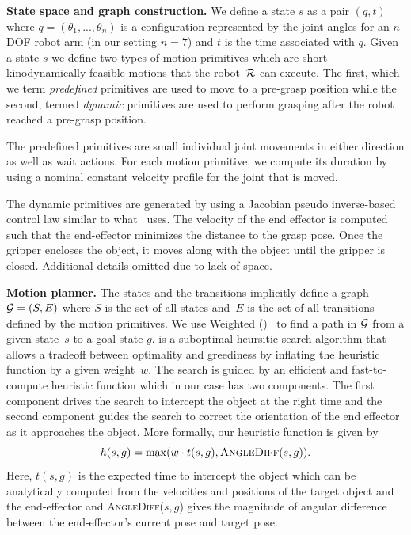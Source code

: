 \documentclass[conference]{IEEEtran}
\begin{document}
\textbf{State space and graph construction.}
We define a state $s$ as a pair $(q,t)$ where $q = (\theta_1, ..., \theta_n)$ is a configuration represented by the joint angles for an $n$-DOF robot arm (in our setting $n=7$) and $t$ is the time associated with $q$.
%
Given a state $s$ we define two types of motion primitives which are short kinodynamically feasible motions that the robot~$\mathcal{R}$ can execute. The first, which we term \emph{predefined} primitives are used to move to a pre-grasp position while the second, termed \emph{dynamic} primitives are used to perform grasping after the robot reached a pre-grasp position.
%

The predefined primitives are small individual joint movements in either direction as well as wait actions.
For each motion primitive, we compute its duration by using a nominal constant velocity profile for the  joint that is moved.
%

The dynamic primitives are generated by using a Jacobian pseudo inverse-based control law similar to what~\cite{menon2014motion} uses. 
The velocity of the end effector is computed such that the end-effector minimizes the distance to the grasp pose. Once the gripper encloses the object, it moves along with the object until the gripper is closed.
Additional details omitted due to lack of space. 

\textbf{Motion planner.}
The states and the transitions implicitly define a graph $\mathcal{G} = (S,E)$ where $S$ is the set of all states and~$E$ is the set of all transitions defined by the motion primitives. We use Weighted \astar (\wastar)~\cite{pohl1970heuristic} to find a path in $\mathcal{G}$ from a given state~$s$ to a goal state $g$. 
\wastar is a suboptimal heursitic search algorithm that allows a tradeoff between optimality and greediness by inflating the heuristic function by a given weight~$w$. 
The search is guided by an efficient and fast-to-compute heuristic function which in our case has two components.
The first component drives the search to intercept the object at the right time and 
the second component guides the search to correct the orientation of the end effector as it approaches the object. 
More formally, our heuristic function is given by
$$
 h(s,g) = \max (w \cdot t(s,g), \textsc{AngleDiff}(s,g)).
$$
Here, $t(s,g)$ is the expected time to intercept the object which can be analytically computed from the velocities and positions of the target object and the end-effector and \textsc{AngleDiff}($s,g$) gives the magnitude of angular difference between the end-effector's current pose and target pose.
\end{document}
